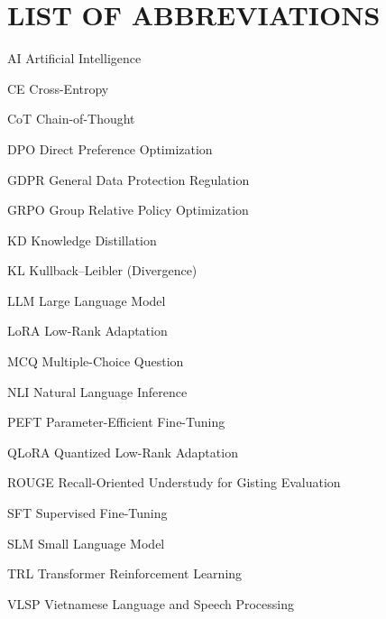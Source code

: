 \titleformat{\chapter}{\fontsize{16}{20}\selectfont\bfseries\centering}{\thechapter}{1ex}{\vspace*{-2.5cm}}
\chapter*{LIST OF ABBREVIATIONS}
\begin{abbrv}
	\item[AI] Artificial Intelligence
	\item[CE] Cross-Entropy
	\item[CoT] Chain-of-Thought
	\item[DPO] Direct Preference Optimization
	\item[GDPR] General Data Protection Regulation
	\item[GRPO] Group Relative Policy Optimization
	\item[KD] Knowledge Distillation
	\item[KL] Kullback--Leibler (Divergence)
	\item[LLM] Large Language Model
	\item[LoRA] Low-Rank Adaptation
	\item[MCQ] Multiple-Choice Question
	\item[NLI] Natural Language Inference
	\item[PEFT] Parameter-Efficient Fine-Tuning
	\item[QLoRA] Quantized Low-Rank Adaptation
	\item[ROUGE] Recall-Oriented Understudy for Gisting Evaluation
	\item[SFT] Supervised Fine-Tuning
	\item[SLM] Small Language Model
	\item[TRL] Transformer Reinforcement Learning
	\item[VLSP] Vietnamese Language and Speech Processing

\end{abbrv}


\newpage
{}
\titleformat{\chapter}[hang]{\bfseries\fontsize{16}{19}\selectfont\raggedright}{\MakeUppercase{\chaptername}\ \thechapter}{1ex}{\MakeUppercase}
\titlespacing*{\chapter}{0pt}{20pt}{20pt}
\pagestyle{fancy}